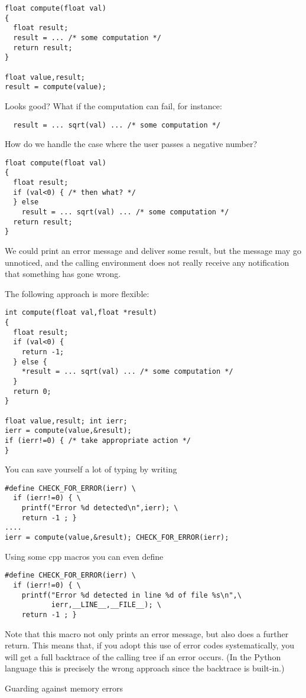 \begin{verbatim}
float compute(float val)
{
  float result;
  result = ... /* some computation */
  return result;
}

float value,result;
result = compute(value);
\end{verbatim}
Looks good? What if the computation can fail, for instance:
\begin{verbatim}
  result = ... sqrt(val) ... /* some computation */
\end{verbatim}
How do we handle the case where the user passes a negative number?
\begin{verbatim}
float compute(float val)
{
  float result;
  if (val<0) { /* then what? */ 
  } else 
    result = ... sqrt(val) ... /* some computation */
  return result;
}
\end{verbatim}
We could print an error message and deliver some result, but the
message may go unnoticed, and the calling environment does not really
receive any notification that something has gone wrong.

The following approach is more flexible:
\begin{verbatim}
int compute(float val,float *result)
{
  float result;
  if (val<0) {
    return -1;
  } else {
    *result = ... sqrt(val) ... /* some computation */
  }
  return 0;
}

float value,result; int ierr;
ierr = compute(value,&result);
if (ierr!=0) { /* take appropriate action */
}
\end{verbatim}
You can save yourself a lot of typing by writing
\begin{verbatim}
#define CHECK_FOR_ERROR(ierr) \
  if (ierr!=0) { \
    printf("Error %d detected\n",ierr); \
    return -1 ; }
....
ierr = compute(value,&result); CHECK_FOR_ERROR(ierr);
\end{verbatim}
Using some cpp macros you can even define
\begin{verbatim}
#define CHECK_FOR_ERROR(ierr) \
  if (ierr!=0) { \
    printf("Error %d detected in line %d of file %s\n",\
           ierr,__LINE__,__FILE__); \
    return -1 ; }
\end{verbatim}
Note that this macro not only prints an error message, but also does a
further return. This means that, if you adopt this use of error codes
systematically, you will get a full backtrace of the calling tree if
an error occurs. (In the Python language this is precisely the wrong
approach since the backtrace is built-in.)

\Level 0 {Guarding against memory errors}

